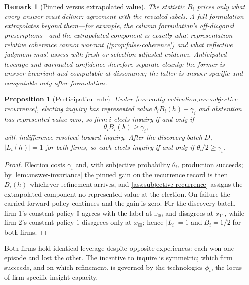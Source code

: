 \documentclass[11pt]{article}
\newtheorem{proposition}[assumption]{Proposition}
\newtheorem{remark}[assumption]{Remark}
\begin{document}
\begin{remark}[Pinned versus extrapolated value]
\label{rem:pinned-extrapolated}
The statistic $B_i$ prices only what every answer must deliver: agreement with
the revealed labels.  A full formulation extrapolates beyond them---for
example, the column formulation's off-diagonal prescriptions---and the
extrapolated component is exactly what representation-relative coherence
cannot warrant (\cref{prop:false-coherence}) and what reflective judgment must
assess with fresh or selection-adjusted evidence.  Anticipated leverage and
warranted confidence therefore separate cleanly: the former is
answer-invariant and computable at dissonance; the latter is answer-specific
and computable only after formulation.
\end{remark}

\begin{proposition}[Participation rule]
\label{prop:participation}
Under \cref{ass:costly-activation,ass:subjective-recurrence}, electing inquiry
has represented value $\theta_iB_i(h)-\gamma_i$ and abstention has represented
value zero, so firm $i$ elects inquiry if and only if
\[
\theta_iB_i(h)\geq\gamma_i,
\]
with indifference resolved toward inquiry.  After the discovery batch
$\overline D$, $\lvert L_i(h)\rvert=1$ for both firms, so each elects inquiry
if and only if $\theta_i/2\geq\gamma_i$.
\end{proposition}

\begin{proof}
Election costs $\gamma_i$ and, with subjective probability $\theta_i$,
production succeeds; by \cref{lem:answer-invariance} the pinned gain on the
recurrence record is then $B_i(h)$ whichever refinement arrives, and
\cref{ass:subjective-recurrence} assigns the extrapolated component no
represented value at the election.  On failure the carried-forward policy
continues and the gain is zero.  For the discovery batch, firm $1$'s constant
policy $0$ agrees with the label at $x_{00}$ and disagrees at $x_{11}$, while
firm $2$'s constant policy $1$ disagrees only at $x_{00}$; hence
$\lvert L_i\rvert=1$ and $B_i=1/2$ for both firms.
\end{proof}

Both firms hold identical leverage despite opposite experiences: each won one
episode and lost the other.  The incentive to inquire is symmetric; which firm
succeeds, and on which refinement, is governed by the technologies $\phi_i$,
the locus of firm-specific insight capacity.
\end{document}
